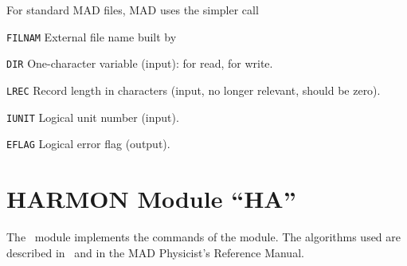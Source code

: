 For standard MAD files, MAD uses the simpler call
\begin{mylist}
\item[\tt FILNAM]
External file name built by 
\item[\tt DIR]
One-character variable (input):  for read,  for
write. 
\item[\tt LREC]
Record length in characters
(input, no longer relevant, should be zero).
\item[\tt IUNIT]
Logical unit number (input).
\item[\tt EFLAG]
Logical error flag (output). 
\end{mylist}


\chapter{HARMON Module ``HA''}
\label{HA}
The ~module implements the commands of the
 module.
The algorithms used are described in~\cite{DONALD} and in the MAD
Physicist's Reference Manual.

